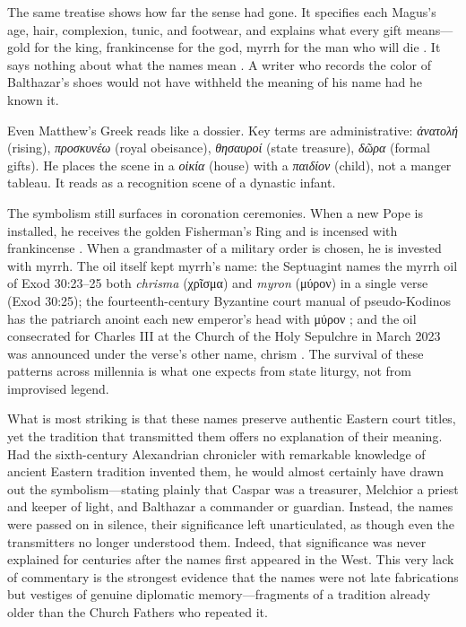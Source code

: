 The same treatise shows how far the sense had gone.
It specifies each Magus’s age, hair, complexion, tunic, and footwear, and explains what every gift means---gold for the king, frankincense for the god, myrrh for the man who will die \cite{pseudobede:excerpta}.
It says nothing about what the names mean \cite{pseudobede:excerpta}.
A writer who records the color of Balthazar’s shoes would not have withheld the meaning of his name had he known it.

Even Matthew’s Greek reads like a dossier.
Key terms are administrative: \textit{ἀνατολή} (rising), \textit{προσκυνέω} (royal obeisance), \textit{θησαυροί} (state treasure), \textit{δῶρα} (formal gifts).
He places the scene in a \textit{οἰκία} (house) with a \textit{παιδίον} (child), not a manger tableau.
It reads as a recognition scene of a dynastic infant.

The symbolism still surfaces in coronation ceremonies.
When a new Pope is installed, he receives the golden Fisherman’s Ring and is incensed with frankincense \cite{ordo:petrini}.
When a grandmaster of a military order is chosen, he is invested with myrrh.
The oil itself kept myrrh’s name: the Septuagint names the myrrh oil of Exod 30:23--25 both \emph{chrisma} (χρῖσμα) and \emph{myron} (μύρον) in a single verse (Exod 30:25); the fourteenth-century Byzantine court manual of pseudo-Kodinos has the patriarch anoint each new emperor’s head with μύρον \cite{pseudokodinos:offices}; and the oil consecrated for Charles III at the Church of the Holy Sepulchre in March 2023 was announced under the verse’s other name, chrism \cite{royal:chrism2023}.
The survival of these patterns across millennia is what one expects from state liturgy, not from improvised legend.

What is most striking is that these names preserve authentic Eastern court titles, yet the tradition that transmitted them offers no explanation of their meaning.
Had the sixth-century Alexandrian chronicler with remarkable knowledge of ancient Eastern tradition invented them, he would almost certainly have drawn out the symbolism---stating plainly that Caspar was a treasurer, Melchior a priest and keeper of light, and Balthazar a commander or guardian.
Instead, the names were passed on in silence, their significance left unarticulated, as though even the transmitters no longer understood them.
Indeed, that significance was never explained for centuries after the names first appeared in the West.
This very lack of commentary is the strongest evidence that the names were not late fabrications but vestiges of genuine diplomatic memory---fragments of a tradition already older than the Church Fathers who repeated it.


